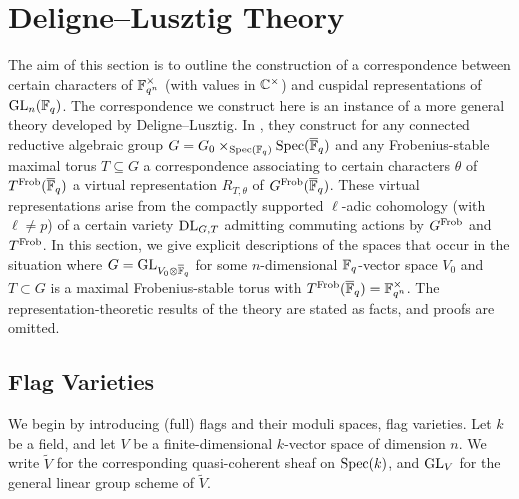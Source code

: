 \documentclass[../main.tex]{subfiles}
\begin{document}
\section{Deligne--Lusztig Theory} 
\label{sec:Deligne--Lusztig Theory} 

\label{sub:Deligne-Lusztig Theory for Depth Zero Representations}
The aim of this section is to outline the construction of a correspondence
between certain characters of $\mathbb{F}_{q^n}^\times$ (with values in $\mathbb{C}^\times$) and 
cuspidal representations of $\operatorname{GL}_n(\mathbb{F}_q)$. The correspondence we construct here
is an instance of a more general theory developed by Deligne--Lusztig. 
In \cite{delignelusztig1976}, they construct
for any connected reductive algebraic group $G = G_0 \times_{\operatorname{Spec}(\mathbb{F}_q)}
\operatorname{Spec}(\overline {\mathbb{F}}_q)$ and any
Frobenius-stable maximal torus $T \subseteq G$ a correspondence associating to
certain characters $\theta$ of $T^{\mathrm{Frob}}({\overline {\mathbb{F}}_q})$ a virtual representation $R_{T,\theta}$ of
$G^{\mathrm{Frob}}({\overline {\mathbb{F}}_q})$. These virtual representations arise from the compactly supported
$\ell$-adic cohomology (with $\ell \neq p$) of a certain variety $\mathrm{DL}_{G,T}$
admitting commuting actions by $G^{\mathrm{Frob}}$ and $T^{\mathrm{Frob}}$. 
In this section, we give explicit descriptions of the spaces that occur
in the situation where $G = \operatorname{GL}_{V_0 \otimes \overline {\mathbb{F}}_q}$ for some
$n$-dimensional $\mathbb{F}_q$-vector space $V_0$ and $T \subset G$ is a maximal
Frobenius-stable torus with $T^{\mathrm{Frob}}(\overline {\mathbb{F}}_q) = \mathbb{F}_{q^n}^\times$.
The representation-theoretic results of the theory are stated as facts, and proofs are omitted. 

\subsection{Flag Varieties} %
\label{ssub:Deligne--Lusztig Varieties}
We begin by introducing (full) flags and their moduli spaces, flag
varieties. Let $k$ be a field, and let $V$ be a finite-dimensional $k$-vector space
of dimension $n$. We write $\tilde V$ for the corresponding quasi-coherent sheaf
on $\operatorname{Spec}(k)$, and $\operatorname{GL}_V$ for the general linear group scheme of $\tilde V$.
\end{document}
